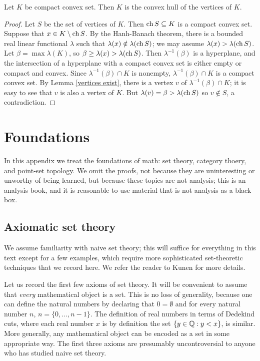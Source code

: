 \begin{theorem}
Let $K$ be compact convex set. Then $K$ is the convex hull of the vertices of $K$.
\end{theorem}
\begin{proof}
Let $S$ be the set of vertices of $K$.
Then $\operatorname{ch} S \subseteq K$ is a compact convex set.
Suppose that $x \in K \setminus \operatorname{ch} S$.
By the Hanh-Banach theorem, there is a bounded real linear functional $\lambda$ such that $\lambda(x) \notin \lambda(\operatorname{ch} S)$; we may assume $\lambda(x) > \lambda(\operatorname{ch} S)$.
Let $\beta = \max \lambda(K)$, so $\beta \geq \lambda(x) > \lambda(\operatorname{ch} S)$.
Then $\lambda^{-1}(\beta)$ is a hyperplane, and the intersection of a hyperplane with a compact convex set is either empty or compact and convex.
Since $\lambda^{-1}(\beta) \cap K$ is nonempty, $\lambda^{-1}(\beta) \cap K$ is a compact convex set.
By Lemma \ref{vertices exist}, there is a vertex $v$ of $\lambda^{-1}(\beta) \cap K$; it is easy to see that $v$ is also a vertex of $K$.
But $\lambda(v) = \beta > \lambda(\operatorname{ch} S)$ so $v \notin S$, a contradiction.
\end{proof}


\chapter{Foundations}
In this appendix we treat the foundations of math: set theory, category thoery, and point-set topology.
We omit the proofs, not because they are uninteresting or unworthy of being learned, but because these topics are not analysis; this is an analysis book, and it is reasonable to use material that is not analysis as a black box.

\section{Axiomatic set theory}
We assume familiarity with naive set theory; this will suffice for everything in this text except for a few examples, which require more sophisticated set-theoretic techniques that we record here.
We refer the reader to Kunen \cite{kunen2011set} for more details.

\begin{subsec}
Let us record the first few axioms of set theory.
It will be convenient to assume that \emph{every} mathematical object is a set.
This is no loss of generality, because one can define the natural numbers by declaring that $0 = \emptyset$ and for every natural number $n$, $n = \{0, \dots, n - 1\}$.
The definition of real numbers in terms of Dedekind cuts, where each real number $x$ is by definition the set $\{y \in \mathbb{Q}: y < x\}$, is similar.
More generally, any mathematical object can be encoded as a set in some appropriate way.
The first three axioms are presumably uncontroversial to anyone who has studied naive set theory.
\end{subsec}

